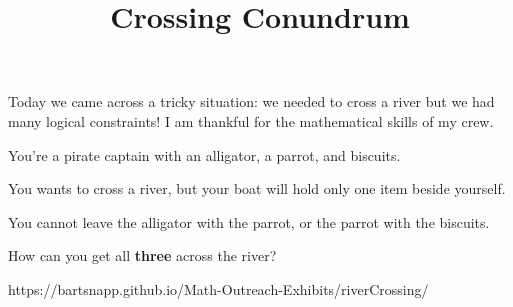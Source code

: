 \documentclass{../exhibit}
\title{Crossing Conundrum}
\begin{document}
\begin{context}
Today we came across a tricky situation: we needed to cross a river but we had many logical constraints!  I am thankful for the mathematical skills of my crew.
\end{context}

\begin{directions}
  You're a pirate captain with an alligator, a parrot, and biscuits.

  You wants to cross a river, but your boat will hold only one item beside yourself.

  You cannot leave the alligator with the parrot, or the parrot with the biscuits.

  How can you get all \textbf{three} across the river? 
\end{directions}

\begin{example}
\end{example}

\begin{mathConnections}
  https://bartsnapp.github.io/Math-Outreach-Exhibits/riverCrossing/
\end{mathConnections}
\end{document}

